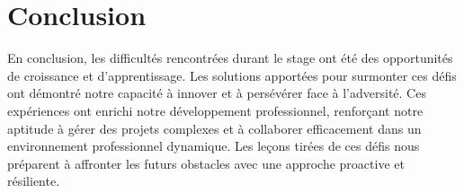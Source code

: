 \newpage
\section*{Conclusion}

\hspace{16pt}En conclusion, les difficultés rencontrées durant le stage ont été des opportunités de croissance et d'apprentissage. Les solutions apportées pour surmonter ces défis ont démontré notre capacité à innover et à persévérer face à l'adversité. Ces expériences ont enrichi notre développement professionnel, renforçant notre aptitude à gérer des projets complexes et à collaborer efficacement dans un environnement professionnel dynamique. Les leçons tirées de ces défis nous préparent à affronter les futurs obstacles avec une approche proactive et résiliente.
